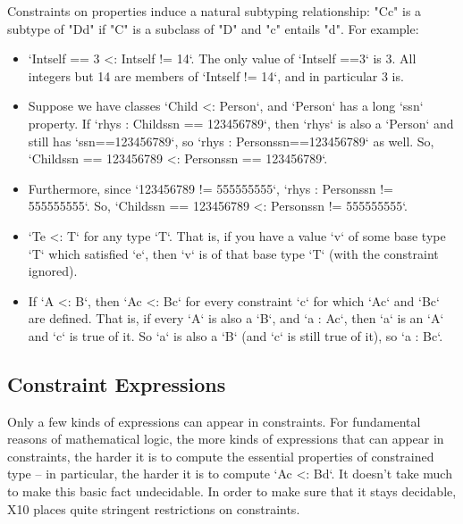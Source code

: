 Constraints on properties induce a natural subtyping relationship:
\xcd"C{c}" is a subtype of
\xcd"D{d}" if \xcd"C" is a subclass of \xcd"D" and
\xcd"c" entails \xcd"d".
For example: 
\begin{itemize}
\item \xcd`Int{self == 3} <: Int{self != 14}`.  The only value of
      \xcd`Int{self ==3}` is 3.  All integers but 14 are members of
      \xcd`Int{self != 14}`, and in particular 3 is.  
\item Suppose we have classes \xcd`Child <: Person`, and \xcd`Person` has a
      long \xcd`ssn` property.  If \xcd`rhys : Child{ssn == 123456789}`, then
      \xcd`rhys` is also a \xcd`Person` and still has \xcd`ssn==123456789`, so 
      \xcd`rhys : Person{ssn==123456789}` as well.  
      So, \xcd`Child{ssn == 123456789} <: Person{ssn == 123456789}`.
\item Furthermore, since \xcd`123456789 != 555555555`, 
      \xcd`rhys : Person{ssn != 555555555}`.  
      So, \xcd`Child{ssn == 123456789} <: Person{ssn != 555555555}`.  
\item \xcd`T{e} <: T` for any type \xcd`T`.  That is, if you have a value
      \xcd`v` of some base type \xcd`T` which satisfied \xcd`e`, then \xcd`v`
      is of that base type \xcd`T` (with the constraint ignored).
\item If \xcd`A <: B`, then \xcd`A{c} <: B{c}` for every constraint \xcd`{c}`
      for which \xcd`A{c}` and \xcd`B{c}` are defined.  That is, if every
      \xcd`A` is also a \xcd`B`, and \xcd`a : A{c}`, then 
      \xcd`a` is an \xcd`A` and \xcd`c` is true of it. So \xcd`a` is also a
      \xcd`B` (and \xcd`c` is still true of 
      it), so \xcd`a : B{c}`.  

\end{itemize}


\subsection{Constraint Expressions}




Only a few kinds of expressions can appear in constraints.  For fundamental
reasons of mathematical logic, the more kinds of expressions that can appear
in constraints, the harder it is to compute the essential properties of
constrained type -- in particular, the harder it is to compute 
\xcd`A{c} <: B{d}`.  It doesn't take much to make this basic fact undecidable.
In order to
make sure that it stays decidable, X10 places quite stringent restrictions on
constraints.  


